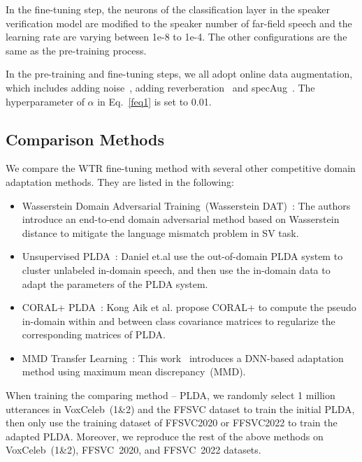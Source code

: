 \documentclass{article}
\begin{document}
In the fine-tuning step, the neurons of the classification layer in the speaker verification model are modified to the speaker number of far-field speech and the learning rate are varying between 1e-8 to 1e-4. The other configurations are the same as the pre-training process. 

In the pre-training and fine-tuning steps, we all adopt online data augmentation, which includes adding noise~\cite{snyder2015musan}, adding reverberation~\cite{habets2006room} and specAug~\cite{park2019specaugment}. The hyperparameter of $\alpha$ in Eq.~\ref{feq1} is set to 0.01.  


 
\subsection{Comparison Methods}
We compare the WTR fine-tuning method with several other competitive domain adaptation methods. They are listed in the following:
\begin{itemize}
     \item Wasserstein Domain Adversarial Training~(Wasserstein DAT)~\cite{rohdin2019speaker}: The authors introduce an end-to-end domain adversarial method based on Wasserstein distance to mitigate the language mismatch problem in SV task.  
    \item Unsupervised PLDA~\cite{garcia2014unsupervised}: Daniel et.al use the out-of-domain PLDA system to cluster unlabeled in-domain speech, and then use the in-domain data to adapt the parameters of the PLDA system.
    \item CORAL+ PLDA~\cite{lee2019coral+}: Kong Aik et al. propose CORAL+ to compute the pseudo in-domain within and between class covariance matrices to regularize the corresponding matrices of PLDA. 
    \item MMD Transfer Learning~\cite{lin2020multi}: This work~\cite{lin2020multi} introduces a DNN-based adaptation method using maximum mean discrepancy~(MMD). 
\end{itemize}
When training the comparing method -- PLDA, we randomly select 1 million utterances in VoxCeleb~(1\&2) and the FFSVC dataset to train the initial PLDA, then only use the training dataset of FFSVC2020 or FFSVC2022 to train the adapted PLDA. Moreover, we reproduce the rest of the above methods on VoxCeleb~(1\&2), FFSVC~2020, and FFSVC~2022 datasets.
\end{document}
